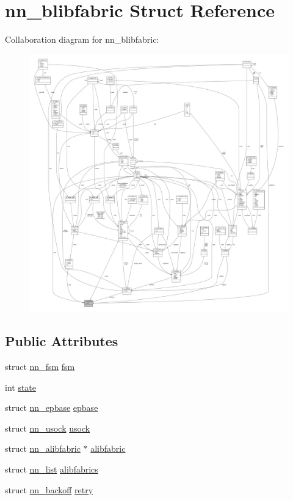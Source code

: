 \hypertarget{structnn__blibfabric}{}\section{nn\+\_\+blibfabric Struct Reference}
\label{structnn__blibfabric}


Collaboration diagram for nn\+\_\+blibfabric\+:\nopagebreak
\begin{figure}[H]
\begin{center}
\leavevmode
\includegraphics[width=350pt]{structnn__blibfabric__coll__graph}
\end{center}
\end{figure}
\subsection*{Public Attributes}
\begin{DoxyCompactItemize}
\item 
struct \hyperlink{structnn__fsm}{nn\+\_\+fsm} \hyperlink{structnn__blibfabric_ac4da7c0cbcb8000dd0bdf92a5f250483}{fsm}
\item 
int \hyperlink{structnn__blibfabric_a215abc4fe37a396adedc66ee4af7de61}{state}
\item 
struct \hyperlink{structnn__epbase}{nn\+\_\+epbase} \hyperlink{structnn__blibfabric_a62a7b18e4d3c4e19d90bbaac7aab58e0}{epbase}
\item 
struct \hyperlink{structnn__usock}{nn\+\_\+usock} \hyperlink{structnn__blibfabric_acb29026f7306bc1de9ec8fdbbdde54af}{usock}
\item 
struct \hyperlink{structnn__alibfabric}{nn\+\_\+alibfabric} $\ast$ \hyperlink{structnn__blibfabric_aab27658e6d4f2fd14369456c72f9a6ed}{alibfabric}
\item 
struct \hyperlink{structnn__list}{nn\+\_\+list} \hyperlink{structnn__blibfabric_a45dd63b7b4f532b8cf89784eb5d8f12c}{alibfabrics}
\item 
struct \hyperlink{structnn__backoff}{nn\+\_\+backoff} \hyperlink{structnn__blibfabric_a6318655e10f61b8d295d6d97133e2380}{retry}
\end{DoxyCompactItemize}


